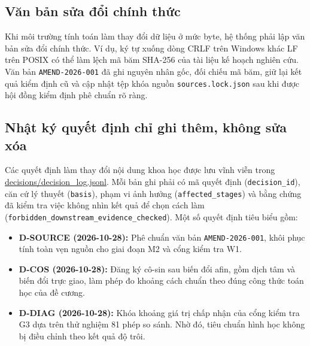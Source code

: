 \subsection{Văn bản sửa đổi chính thức}
Khi môi trường tính toán làm thay đổi dữ liệu ở mức byte, hệ thống phải lập văn bản sửa đổi chính thức. Ví dụ, ký tự xuống dòng CRLF trên Windows khác LF trên POSIX có thể làm lệch mã băm SHA-256 của tài liệu kế hoạch nghiên cứu. Văn bản \texttt{AMEND-2026-001} đã ghi nguyên nhân gốc, đối chiếu mã băm, giữ lại kết quả kiểm định cũ và cập nhật tệp khóa nguồn \texttt{sources.lock.json} sau khi được hội đồng kiểm định phê chuẩn rõ ràng.

\subsection{Nhật ký quyết định chỉ ghi thêm, không sửa xóa}
Các quyết định làm thay đổi nội dung khoa học được lưu vĩnh viễn trong \url{decisions/decision_log.jsonl}. Mỗi bản ghi phải có mã quyết định (\texttt{decision\_id}), căn cứ lý thuyết (\texttt{basis}), phạm vi ảnh hưởng (\texttt{affected\_stages}) và bằng chứng đã kiểm tra việc không nhìn kết quả để chọn cách làm (\texttt{forbidden\_downstream\_evidence\_checked}). Một số quyết định tiêu biểu gồm:
\begin{itemize}
    \item \textbf{D-SOURCE (2026-10-28):} Phê chuẩn văn bản \texttt{AMEND-2026-001}, khôi phục tính toàn vẹn nguồn cho giai đoạn M2 và cổng kiểm tra W1.
    \item \textbf{D-COS (2026-10-28):} Đăng ký cô-sin sau biến đổi afin, gồm dịch tâm và biến đổi trực giao, làm phép đo khoảng cách chuẩn theo đúng công thức toán học của đề cương.
    \item \textbf{D-DIAG (2026-10-28):} Khóa khoảng giá trị chấp nhận của cổng kiểm tra G3 dựa trên thử nghiệm 81 phép so sánh. Nhờ đó, tiêu chuẩn hình học không bị điều chỉnh theo kết quả độ trôi.
\end{itemize}
